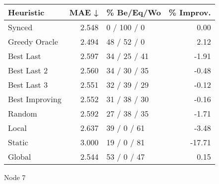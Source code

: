 \begin{tabular}{lrlr}
\toprule
\textbf{Heuristic} & \textbf{MAE ↓} & \textbf{\% Be/Eq/Wo} & \textbf{\% Improv.} \\
\midrule
            Synced &          2.548 &          0 / 100 / 0 &                0.00 \\
     Greedy Oracle &          2.494 &          48 / 52 / 0 &                2.12 \\
         Best Last &          2.597 &         34 / 25 / 41 &               -1.91 \\
       Best Last 2 &          2.560 &         34 / 30 / 35 &               -0.48 \\
       Best Last 3 &          2.551 &         32 / 39 / 29 &               -0.12 \\
    Best Improving &          2.552 &         31 / 38 / 30 &               -0.16 \\
            Random &          2.592 &         27 / 38 / 35 &               -1.71 \\
             Local &          2.637 &          39 / 0 / 61 &               -3.48 \\
            Static &          3.000 &          19 / 0 / 81 &              -17.71 \\
            Global &          2.544 &          53 / 0 / 47 &                0.15 \\
\bottomrule
\end{tabular}
\caption{Node 7}
\label{tab:hr_iid_lr05_le2_bs4_7}
